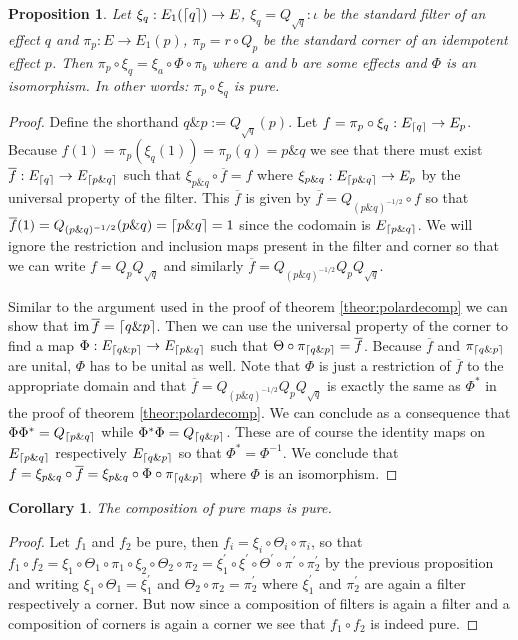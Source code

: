 \documentclass[submission,copyright,creativecommons]{eptcs}
\newcounter{main}
\newtheorem{proposition}[main]{Proposition}
\newtheorem{corollary}[main]{Corollary}
\theoremstyle{definition}
\DeclarePairedDelimiter{\ceil}{\lceil}{\rceil}
\newcommand{\cl}[1]{\overline{#1}}
\DeclareMathOperator{\im}{im}
\begin{document}
\begin{proposition}
	Let $\xi_q: E_1(\ceil{q})\rightarrow E$, $\xi_q =
	Q_{\sqrt{q}}\colon \iota$ be the standard filter of an
	effect $q$ and $\pi_p\colon E\rightarrow E_1(p)$, $\pi_p = r\circ
	Q_p$ be the standard corner of an idempotent effect $p$.
	Then $\pi_p \circ \xi_q = \xi_a\circ \Phi\circ \pi_b$ where
	$a$ and $b$ are some effects and $\Phi$ is an isomorphism.
	In other words: $\pi_p\circ \xi_q$ is pure.
\end{proposition}
\begin{proof}
	Define the shorthand $q\&p:= Q_{\sqrt{q}}(p)$. Let $f = \pi_p \circ \xi_q: E_{\ceil{q}} \rightarrow E_p$. Because $f(1) = \pi_p (\xi_q(1)) = \pi_p(q) = p\& q$ we see that there must exist $\cl{f}: E_{\ceil{q}}\rightarrow E_{\ceil{p\&q}}$ such that $\xi_{p\& q}\circ \cl{f} = f$ where $\xi_{p\& q}:E_{\ceil{p\&q}}\rightarrow E_p$ by the universal property of the filter. This $\cl{f}$ is given by $\cl{f} = Q_{(p\& q)^{-1/2}}\circ f$ so that $\cl{f}(1) = Q_{(p\& q)^{-1/2}}(p\& q) = \ceil{p\& q} = 1$ since the codomain is $E_{\ceil{p\& q}}$. We will ignore the restriction and inclusion maps present in the filter and corner so that we can write $f = Q_p Q_{\sqrt{q}}$ and similarly $\cl{f} = Q_{(p\& q)^{-1/2}}Q_p Q_{\sqrt{q}}$.

	Similar to the argument used in the proof of theorem \ref{theor:polardecomp} we can show that $\im{\cl{f}} = \ceil{q\& p}$. Then we can use the universal property of the corner to find a map $\Phi: E_{\ceil{q\& p}}\rightarrow E_{\ceil{p\& q}}$ such that $\Theta\circ \pi_{\ceil{q\& p}} = \cl{f}$. Because $\cl{f}$ and $\pi_{\ceil{q\& p}}$ are unital, $\Phi$ has to be unital as well. Note that $\Phi$ is just a restriction of $\cl{f}$ to the appropriate domain and that $\cl{f} = Q_{(p\& q)^{-1/2}}Q_p Q_{\sqrt{q}}$ is exactly the same as $\Phi^*$ in the proof of theorem \ref{theor:polardecomp}. We can conclude as a consequence that $\Phi\Phi^* = Q_{\ceil{p\& q}}$ while $\Phi^*\Phi = Q_{\ceil{q\& p}}$. These are of course the identity maps on $E_{\ceil{p\&q}}$ respectively $E_{\ceil{q\& p}}$ so that $\Phi^* = \Phi^{-1}$. We conclude that $f = \xi_{p\& q} \circ \cl{f} = \xi_{p\& q}\circ \Phi \circ \pi_{\ceil{q\& p}}$ where $\Phi$ is an isomorphism.
\end{proof}
\begin{corollary}\label{cor:purepure}
The composition of pure maps is pure.
\end{corollary}
\begin{proof}
	Let $f_1$ and $f_2$ be pure, then $f_i=\xi_i\circ \Theta_i\circ \pi_i$, so that $f_1\circ f_2 = \xi_1\circ \Theta_1\circ \pi_1 \circ \xi_2 \circ \Theta_2\circ \pi_2 = \xi_1^\prime \circ \xi^\prime\circ \Theta^\prime \circ \pi^\prime \circ \pi_2^\prime$ by the previous proposition and writing $\xi_1\circ \Theta_1 = \xi_1^\prime$ and $\Theta_2\circ \pi_2 = \pi_2^\prime$ where $\xi_1^\prime$ and $\pi_2^\prime$ are again a filter respectively a corner. But now since a composition of filters is again a filter and a composition of corners is again a corner we see that $f_1\circ f_2$ is indeed pure.
\end{proof}
\end{document}
